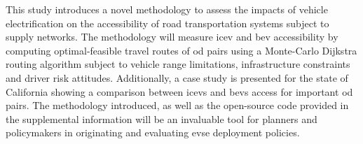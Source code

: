 \documentclass[12pt]{article}
\begin{document}
This study introduces a novel methodology to assess the impacts of vehicle electrification on the accessibility of road transportation systems subject to supply networks. The methodology will measure \gls{icev} and \gls{bev} accessibility by computing optimal-feasible travel routes of \gls{od} pairs using a Monte-Carlo Dijkstra routing algorithm subject to vehicle range limitations, infrastructure constraints and driver risk attitudes. Additionally, a case study is presented for the state of California showing a comparison between \glspl{icev} and \glspl{bev} access for important \gls{od} pairs. The methodology introduced, as well as the open-source code provided in the supplemental information will be an invaluable tool for planners and policymakers in originating and evaluating \gls{evse} deployment policies.

\printbibliography
\end{document}
